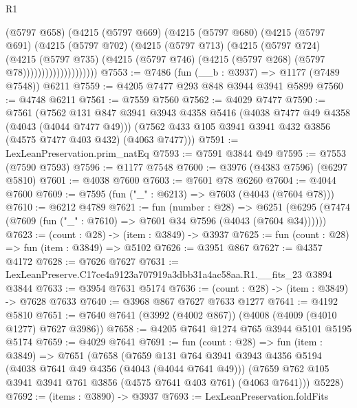 \begin{lexlean}{R1}
\begin{coremodule}
                        (@5797 @658)
                        (@4215
                          (@5797 @669)
                          (@4215
                            (@5797 @680)
                            (@4215
                              (@5797 @691)
                              (@4215
                                (@5797 @702)
                                (@4215
                                  (@5797 @713)
                                  (@4215
                                    (@5797 @724)
                                    (@4215
                                      (@5797 @735)
                                      (@4215
                                        (@5797 @746)
                                        (@4215 (@5797 @268) (@5797 @78))))))))))))))))))))
@7553 := @7486 (fun (__b : @3937) => @1177 (@7489 @7548)) @6211
@7559 := @4205 @7477 @293 @848 @3944 @3941 @5899
@7560 := @4748 @6211
@7561 := @7559 @7560
@7562 := @4029 @7477
@7590 := @7561
    (@7562
      @131
      @847
      @3941
      @3943
      @4358
      @5416
      (@4038 @7477 @49 @4358 (@4043 (@4044 @7477 @49)))
      (@7562 @433 @105 @3941 @3941 @432 @3856 (@4575 @7477 @403 @432) (@4063 @7477)))
@7591 := LexLeanPreservation.prim_natEq
@7593 := @7591 @3844 @49
@7595 := @7553 (@7590 @7593)
@7596 := @1177 @7548
@7600 := @3976 (@4383 @7596) (@6297 @5810)
@7601 := @4038 @7600
@7603 := @7601 @78 @6260
@7604 := @4044 @7600
@7609 := @7595 (fun ("_" : @6213) => @7603 (@4043 (@7604 @78)))
@7610 := @6212 @4789
@7621 := fun (number : @28) =>
  @6251 (@6295 (@7474 (@7609 (fun ("_" : @7610) => @7601 @34 @7596 (@4043 (@7604 @34))))))
@7623 := (count : @28) -> (item : @3849) -> @3937
@7625 := fun (count : @28) => fun (item : @3849) => @5102
@7626 := @3951 @867
@7627 := @4357 @4172
@7628 := @7626 @7627
@7631 := LexLeanPreserve.C17ce4a9123a707919a3dbb31a4ac58aa.R1.__fits_23 @3894 @3844
@7633 := @3954 @7631 @5174
@7636 := (count : @28) -> (item : @3849) -> @7628 @7633
@7640 := @3968 @867 @7627 @7633 @1277
@7641 := @4192 @5810
@7651 := @7640 @7641 (@3992 (@4002 @867)) (@4008 (@4009 (@4010 @1277) @7627 @3986))
@7658 := @4205 @7641 @1274 @765 @3944 @5101 @5195 @5174
@7659 := @4029 @7641
@7691 := fun (count : @28) =>
  fun (item : @3849) =>
  @7651
    (@7658
      (@7659
        @131
        @764
        @3941
        @3943
        @4356
        @5194
        (@4038 @7641 @49 @4356 (@4043 (@4044 @7641 @49)))
        (@7659 @762 @105 @3941 @3941 @761 @3856 (@4575 @7641 @403 @761) (@4063 @7641)))
      @5228)
@7692 := (items : @3890) -> @3937
@7693 := LexLeanPreservation.foldFits

\end{coremodule}
\end{lexlean}
